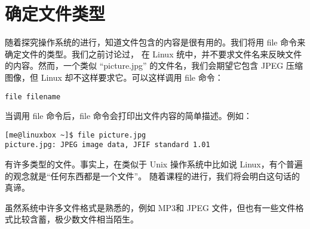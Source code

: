\section{确定文件类型} %
\label{sec:确定文件类型}
随着探究操作系统的进行，知道文件包含的内容是很有用的。我们将用 file 命令来确定文件的类型。我们之前讨论过， 在 Linux 统中，并不要求文件名来反映文件的内容。然而，一个类似 “picture.jpg” 的文件名，我们会期望它包含 JPEG 压缩图像，但 Linux 却不这样要求它。可以这样调用 file 命令：

\begin{lstlisting}
file filename
\end{lstlisting}

\par 当调用 file 命令后，file 命令会打印出文件内容的简单描述。例如：

\begin{lstlisting}
[me@linuxbox ~]$ file picture.jpg
picture.jpg: JPEG image data, JFIF standard 1.01
\end{lstlisting}

\par 有许多类型的文件。事实上，在类似于 Unix 操作系统中比如说 Linux，有个普遍的观念就是“任何东西都是一个文件”。 随着课程的进行，我们将会明白这句话的真谛。

\par 虽然系统中许多文件格式是熟悉的，例如 MP3和 JPEG 文件，但也有一些文件格式比较含蓄，极少数文件相当陌生。


